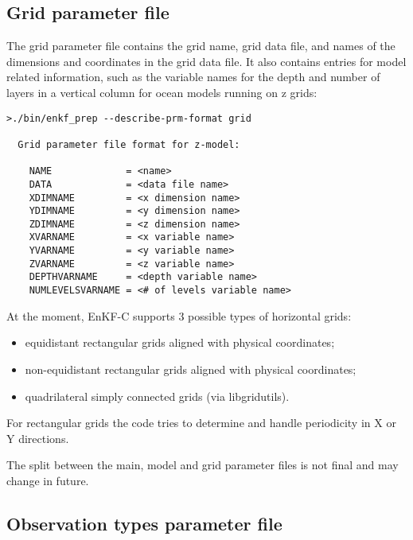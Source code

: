 \documentclass[11pt]{report}
\begin{document}
\subsection{Grid parameter file}

The grid parameter file contains the grid name, grid data file, and names of the dimensions and coordinates in the grid data file.
It also contains entries for model related information, such as the variable names for the depth and number of layers in a vertical column for ocean models running on z grids:
\begin{Verbatim}[frame=single,fontsize=\footnotesize]
>./bin/enkf_prep --describe-prm-format grid

  Grid parameter file format for z-model:

    NAME             = <name>
    DATA             = <data file name>
    XDIMNAME         = <x dimension name>
    YDIMNAME         = <y dimension name>
    ZDIMNAME         = <z dimension name>
    XVARNAME         = <x variable name>
    YVARNAME         = <y variable name>
    ZVARNAME         = <z variable name>
    DEPTHVARNAME     = <depth variable name>
    NUMLEVELSVARNAME = <# of levels variable name>
\end{Verbatim}

At the moment, EnKF-C supports 3 possible types of horizontal grids:
\begin{itemize}
\item equidistant rectangular grids aligned with physical coordinates;
\item non-equidistant rectangular grids aligned with physical coordinates;
\item quadrilateral simply connected grids (via libgridutils).
\end{itemize}
For rectangular grids the code tries to determine and handle periodicity in X or Y directions.

The split between the main, model and grid parameter files is not final and may change in future.

\subsection{Observation types parameter file}
\label{sec:obstypesprm}
\end{document}
